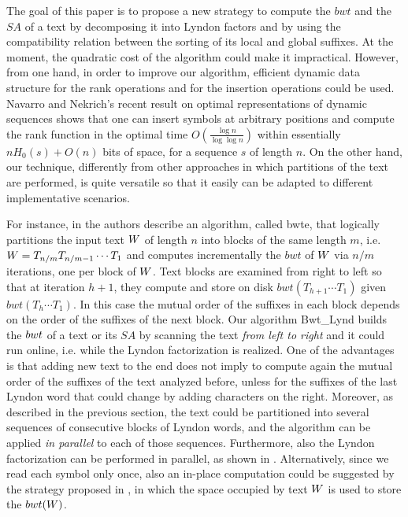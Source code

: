 \documentclass[envcountsame,runningheads]{llncs}
\begin{document}
The goal of this paper is to propose a new strategy to compute the $bwt$ and the $SA$ of a text by decomposing it into Lyndon factors and by using the compatibility relation between the sorting of its local and global suffixes. At the moment, the quadratic cost of the algorithm could make it impractical. However, from one hand, in order to improve our algorithm, efficient dynamic data structure for the rank operations and for the insertion operations could be used. Navarro and Nekrich's recent result \cite{NNsoda13} on optimal representations of dynamic sequences shows that one can insert symbols at arbitrary positions and compute the rank function in the optimal time $O(\frac{\log n}{\log \log n})$ within essentially $nH_0(s) + O(n)$ bits of space, for a sequence $s$ of length $n$.
On the other hand, our technique, differently from other approaches in which partitions of the text are performed, is quite versatile so that it easily can be adapted to different implementative scenarios.

For instance, in \cite{FerraginaGagieManzini2012} the authors describe an algorithm, called {\sc bwte}, that logically partitions the input text $W$ of length $n$ into blocks of the same length $m$, i.e. $W = T_{n/m}T_{n/m-1} \cdots  T_1$ and computes incrementally the $bwt$ of $W$ via $n/m$ iterations, one per block of $W$.
Text blocks are examined from right to left so that at iteration $h + 1$, they compute and store on disk $bwt(T_{h+1} \cdots T_1)$ given $bwt(T_{h} \cdots T_1)$. In this case the mutual order of the suffixes in each block depends on the order of the suffixes of the next block. Our algorithm {\sc Bwt\_Lynd} builds the ${bwt}$ of a text or its $SA$ by scanning the text \emph{from left to right} and it could run online, i.e. while the Lyndon factorization is realized. One of the advantages is that adding new text to the end does not imply to compute again the mutual order of the suffixes of the text analyzed before, unless for the suffixes of the last Lyndon word that could change by adding characters on the right. Moreover, as described in the previous section, the text could be partitioned into several sequences of consecutive blocks of Lyndon words, and the algorithm can be applied \emph{in parallel} to each of those sequences. Furthermore, also the Lyndon factorization can be performed in parallel, as shown in \cite{ApostolicoCrochemore1995}. Alternatively, since we read each symbol only once, also an in-place computation could be suggested by the strategy proposed in \cite{CGKL_CPM2013}, in which the space occupied by text $W$ is used to store the $bwt(W)$.
\end{document}
